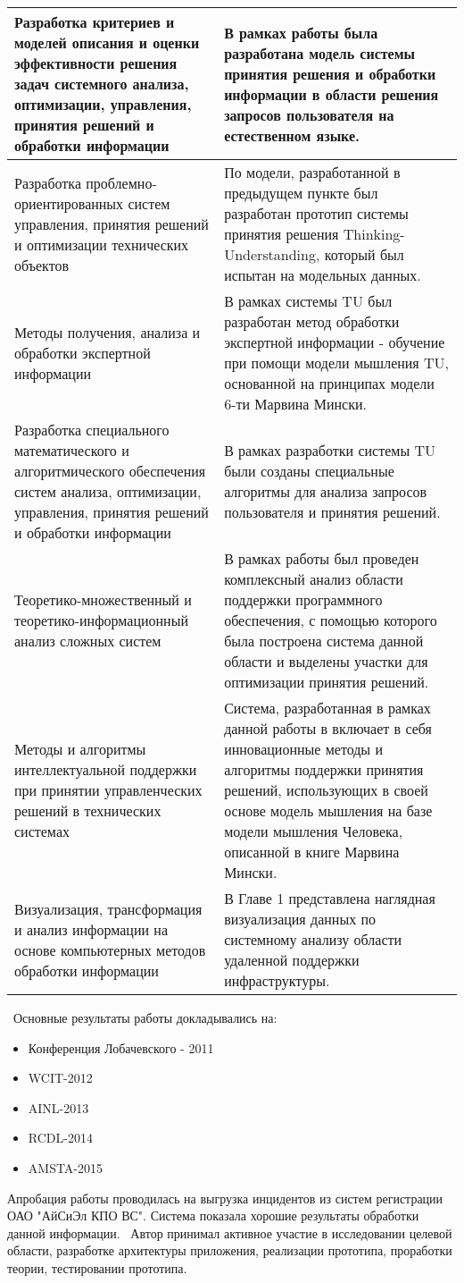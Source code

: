 \begin{longtable}{|p{7cm}|p{9cm}|}
\hline \hline
\endlastfoot
\hline
   Разработка критериев и моделей описания и оценки эффективности решения задач системного анализа, оптимизации, управления, принятия решений и обработки информации & В рамках работы была разработана модель системы принятия решения и обработки информации в области решения запросов пользователя на естественном языке. \\
   \hline
   Разработка проблемно-ориентированных систем управления, принятия решений и оптимизации технических объектов & По модели, разработанной в предыдущем пункте был разработан прототип системы принятия решения Thinking-Understanding, который был испытан на модельных данных.\\
   \hline
   Методы получения, анализа и обработки экспертной информации & В рамках системы TU был разработан метод обработки экспертной информации - обучение при помощи модели мышления TU, основанной на принципах модели 6-ти Марвина Мински. \\
   \hline
   Разработка специального математического и алгоритмического обеспечения систем анализа, оптимизации, управления, принятия решений и обработки информации & В рамках разработки системы TU были созданы специальные алгоритмы для анализа запросов пользователя и принятия решений.\\
  \hline 
  Теоретико-множественный и теоретико-информационный анализ сложных систем & В рамках работы был проведен комплексный анализ области поддержки программного обеспечения, с помощью которого была построена система данной области и выделены участки для оптимизации принятия решений.\\
  \hline
  Методы и алгоритмы интеллектуальной поддержки при принятии управленческих решений в технических системах & Система, разработанная в рамках данной работы в включает в себя инновационные методы и алгоритмы поддержки принятия решений, использующих в своей основе модель мышления на базе модели мышления Человека, описанной в книге Марвина Мински. \\ 
  \hline
  Визуализация, трансформация и анализ информации на основе компьютерных методов обработки информации & В Главе 1 представлена наглядная визуализация данных по системному анализу области удаленной поддержки инфраструктуры. \\
  \hline	
\end{longtable}


\probation\
Основные результаты работы докладывались на:
\begin{itemize}
	\item Конференция Лобачевского - 2011
	\item WCIT-2012
	\item AINL-2013
	\item RCDL-2014
	\item AMSTA-2015
\end{itemize}
Апробация работы проводилась на выгрузка инцидентов из систем регистрации ОАО "АйСиЭл КПО ВС". Система показала хорошие результаты обработки данной информации. 
\contribution\ Автор принимал активное участие в исследовании целевой области, разработке архитектуры приложения, реализации прототипа, проработки теории, тестировании прототипа.

